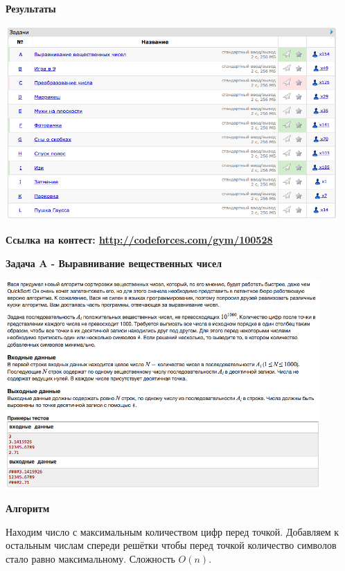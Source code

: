 \documentclass[a4paper,12pt]{article}
\begin{document}
\textbf{{\large Результаты}} \\
\begin{center}
\includegraphics[width=0.95\textwidth]{CT_school_nn/CT_school_nn_result.png}\\ [1cm]
\end{center}

\textbf{{\large Ссылка на контест: \url{http://codeforces.com/gym/100528}}}

\newpage
\textbf{{\large Задача A - Выравнивание вещественных чисел}}

\begin{center}
\includegraphics[width=0.9\textwidth]{CT_school_nn/CT_school_nn_A.png}\\ [1cm]
\end{center}

\textbf{{\large Алгоритм}}

Находим число с максимальным количеством цифр перед точкой. Добавляем к остальным числам спереди решётки чтобы перед точкой количество символов стало равно максимальному. Сложность $O(n)$. \\
\end{document}
